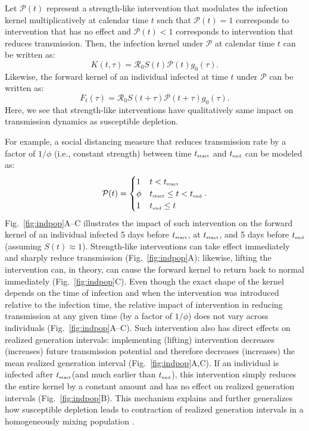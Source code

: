\documentclass[12pt]{article}
\newcommand{\fref}[1]{Fig.~\ref{fig:#1}}
\newcommand{\Rx}[1]{\ensuremath{{\mathcal R}_{#1}}\xspace}
\newcommand{\Ro}{\Rx{0}}
\newcommand{\tsub}[2]{#1_{{\textrm{\tiny #2}}}}
\newcommand{\tstart}{\ensuremath{\tsub{t}{start}}\xspace}
\newcommand{\tend}{\ensuremath{\tsub{t}{end}}\xspace}
\newcommand{\PP}{{\mathcal P}}
\begin{document}
Let $\PP(t)$ represent a strength-like intervention that modulates the infection kernel multiplicatively at calendar time $t$ such that $\PP(t)=1$ corresponds to intervention that has no effect and $\PP(t) < 1$ corresponds to intervention that reduces transmission.
Then, the infection kernel under $\PP$ at calendar time $t$ can be written as:
\begin{equation}
K(t, \tau) = \Ro S(t) \PP(t) g_0(\tau).
\end{equation}
Likewise, the forward kernel of an individual infected at time $t$ under $\PP$ can be written as:
\begin{equation}
F_t(\tau) =  \Ro S(t+\tau) \PP(t + \tau) g_0(\tau).
\end{equation}
Here, we see that strength-like interventions have qualitatively same impact on transmission dynamics as susceptible depletion.

For example, a social distancing measure that reduces transmission rate by a factor of $1/\phi$ (i.e., constant strength) between time \tstart and \tend can be modeled as:
\begin{equation}
\PP(t) = \begin{cases}
1 & t < \tstart\\
\phi & \tstart \leq t < \tend\\
1 & \tend \leq t
\end{cases}.
\end{equation}
\fref{indpop}A--C illustrates the impact of such intervention on the forward kernel of an individual infected 5 days before $\tstart$, at $\tstart$, and 5 days before $\tend$ (assuming $S(t) \approx 1$).
Strength-like interventions can take effect immediately and sharply reduce transmission (\fref{indpop}A);
likewise, lifting the intervention can, in theory, can cause the forward kernel to return back to normal immediately (\fref{indpop}C).
Even though the exact shape of the kernel depends on the time of infection and when the intervention was introduced relative to the infection time, the relative impact of intervention in reducing transmission at any given time (by a factor of $1/\phi$) does not vary across individuals (\fref{indpop}A--C).
Such intervention also has direct effects on realized generation intervals:
implementing (lifting) intervention decreases (increases) future transmission potential and therefore decreases (increases) the mean realized generation interval (\fref{indpop}A,C).
If an individual is infected after \tstart (and much earlier than \tend), this intervention simply reduces the entire kernel by a constant amount and has no effect on realized generation intervals (\fref{indpop}B).
This mechanism explains and further generalizes how susceptible depletion leads to contraction of realized generation intervals in a homogeneously mixing population \citep{kenah2008generation,nishiura2010time,champredon2015intrinsic}. 
\end{document}
